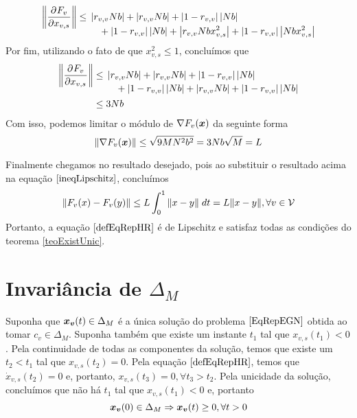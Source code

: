 \begin{equation}
    \left\|\pdv{F_v}{x_{v,s}}\right\| \leq \!\begin{multlined}[t]
        \left| r_{v,v} N b \right| +
        \left|r_{v,v} N b \right| +
        \left|1-r_{v,v}\right| \left| N b \right| \\ + 
        \left|1-r_{v,v}\right| \left| N b \right| +
        \left|r_{v,v} N b x_{v,s}^2 \right|
        +  \left|1-r_{v,v}\right| \left| N b x_{v,s}^2\right|
    \end{multlined}
\end{equation}
Por fim, utilizando o fato de que $x_{v,s}^2\leq 1$, concluímos que
\begin{equation}
\begin{split}
    \left\|\pdv{F_v}{x_{v,s}}\right\| &\leq \!\begin{multlined}[t]
        \left| r_{v,v} N b \right| +
        \left|r_{v,v} N b \right| +
        \left|1-r_{v,v}\right| \left| N b \right| \\+ 
        \left|1-r_{v,v}\right| \left| N b \right| +
        \left|r_{v,v} N b \right| +
        \left|1-r_{v,v}\right| \left| N b\right|
    \end{multlined}\\
    &\leq 3 N b
\end{split}
\end{equation}
Com isso, podemos limitar o módulo de $\nabla F_v(\boldsymbol{x})$ da seguinte forma
\begin{equation}
    \left\|\nabla F_v(\boldsymbol{x})\right\| \leq \sqrt{9MN^2b^2} = 3 N b \sqrt{M} = L
\end{equation}

Finalmente chegamos no resultado desejado, pois ao substituir o resultado acima na equação $\eqref{ineqLipschitz}$, concluímos
\begin{equation}
    \|F_v(x)-F_v(y)\|\leq L \int_0^1 \|x-y\| \; dt = L\|x-y\|,\forall v\in\mathcal{V}
\end{equation}
Portanto, a equação $\eqref{defEqRepHR}$ é de Lipschitz e satisfaz todas as condições do teorema \ref{teoExistUnic}.


\section{Invariância de $\Delta_M$}

Suponha que $\boldsymbol{x_v}(t)\in\Delta_M$ é a única solução do problema $\eqref{EqRepEGN}$ obtida ao tomar $c_v\in\Delta_M$. Suponha também que existe um instante $t_1$ tal que $x_{v,s}(t_1)<0$. Pela continuidade de todas as componentes da solução, temos que existe um $t_2<t_1$ tal que $x_{v,s}(t_2)=0$. Pela equação $\eqref{defEqRepHR}$, temos que $\Dot{x}_{v,s}(t_2)=0$ e, portanto, $x_{v,s}(t_3)=0,\forall t_3>t_2$. Pela unicidade da solução, concluímos que não há $t_1$ tal que $x_{v,s}(t_1)<0$ e, portanto
\begin{equation}
\label{invariancia1}
    \boldsymbol{x_v}(0)\in\Delta_M \Rightarrow \boldsymbol{x_v}(t)\geq 0,\forall t>0
\end{equation}

